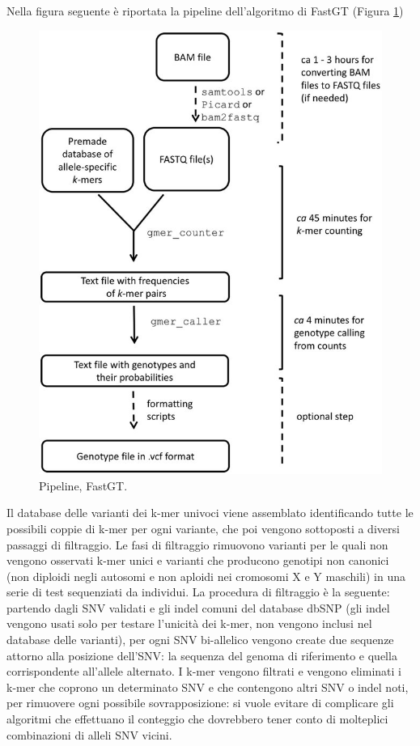 \documentclass[../main.tex]{subfiles}
\begin{document}
Nella figura seguente è riportata la pipeline dell'algoritmo di FastGT (Figura \ref{fig:fastgt})

 \begin{figure}[h!]
	\centering
  	\captionsetup{justification=centering}
  	\includegraphics[scale=.25]{images/fastgt-pipeline.jpg}
  	\caption{Pipeline, FastGT.}
  	\label{fig:fastgt}
\end{figure}

Il database delle varianti dei k-mer univoci viene assemblato identificando tutte le possibili coppie di k-mer per ogni variante, che poi vengono sottoposti a diversi passaggi di filtraggio. Le fasi di filtraggio rimuovono varianti per le quali non vengono osservati k-mer unici e varianti che producono genotipi non canonici (non diploidi negli autosomi e non aploidi nei cromosomi X e Y maschili) in una serie di test sequenziati da individui. La procedura di filtraggio è la seguente: partendo dagli SNV validati e gli indel comuni del database dbSNP (gli indel vengono usati solo per testare l'unicità dei k-mer, non vengono inclusi nel database delle varianti), per ogni SNV bi-allelico vengono create due sequenze attorno alla posizione dell'SNV: la sequenza del genoma di riferimento e quella corrispondente all'allele alternato. I k-mer vengono filtrati e vengono eliminati i k-mer che coprono un determinato SNV e che contengono altri SNV o indel noti, per rimuovere ogni possibile sovrapposizione: si vuole evitare di complicare gli algoritmi che effettuano il conteggio che dovrebbero tener conto di molteplici combinazioni di alleli SNV vicini. 
\end{document}
